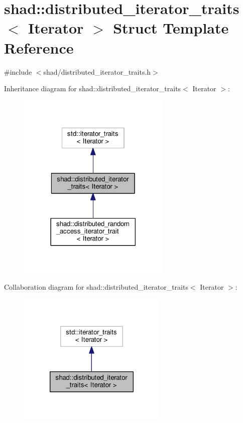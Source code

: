 \hypertarget{structshad_1_1distributed__iterator__traits}{\section{shad\-:\-:distributed\-\_\-iterator\-\_\-traits$<$ Iterator $>$ Struct Template Reference}
\label{structshad_1_1distributed__iterator__traits}
}


{\ttfamily \#include $<$shad/distributed\-\_\-iterator\-\_\-traits.\-h$>$}



Inheritance diagram for shad\-:\-:distributed\-\_\-iterator\-\_\-traits$<$ Iterator $>$\-:
\nopagebreak
\begin{figure}[H]
\begin{center}
\leavevmode
\includegraphics[width=206pt]{structshad_1_1distributed__iterator__traits__inherit__graph}
\end{center}
\end{figure}


Collaboration diagram for shad\-:\-:distributed\-\_\-iterator\-\_\-traits$<$ Iterator $>$\-:
\nopagebreak
\begin{figure}[H]
\begin{center}
\leavevmode
\includegraphics[width=202pt]{structshad_1_1distributed__iterator__traits__coll__graph}
\end{center}
\end{figure}
